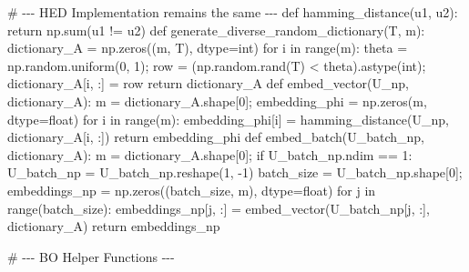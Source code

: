 \documentclass[
  letterpaper,
  DIV=11,
  numbers=noendperiod]{scrartcl}
\newenvironment{Shaded}{\begin{snugshade}}{\end{snugshade}}
\newcommand{\BuiltInTok}[1]{\textcolor[rgb]{0.00,0.23,0.31}{#1}}
\newcommand{\CommentTok}[1]{\textcolor[rgb]{0.37,0.37,0.37}{#1}}
\newcommand{\ControlFlowTok}[1]{\textcolor[rgb]{0.00,0.23,0.31}{#1}}
\newcommand{\DecValTok}[1]{\textcolor[rgb]{0.68,0.00,0.00}{#1}}
\newcommand{\KeywordTok}[1]{\textcolor[rgb]{0.00,0.23,0.31}{#1}}
\newcommand{\NormalTok}[1]{\textcolor[rgb]{0.00,0.23,0.31}{#1}}
\newcommand{\OperatorTok}[1]{\textcolor[rgb]{0.37,0.37,0.37}{#1}}
\begin{document}
\begin{Shaded}
\begin{Highlighting}[]
\CommentTok{\# {-}{-}{-} HED Implementation remains the same {-}{-}{-}}
\KeywordTok{def}\NormalTok{ hamming\_distance(u1, u2): }\ControlFlowTok{return}\NormalTok{ np.}\BuiltInTok{sum}\NormalTok{(u1 }\OperatorTok{!=}\NormalTok{ u2)}
\KeywordTok{def}\NormalTok{ generate\_diverse\_random\_dictionary(T, m):}
\NormalTok{    dictionary\_A }\OperatorTok{=}\NormalTok{ np.zeros((m, T), dtype}\OperatorTok{=}\BuiltInTok{int}\NormalTok{)}
    \ControlFlowTok{for}\NormalTok{ i }\KeywordTok{in} \BuiltInTok{range}\NormalTok{(m): theta }\OperatorTok{=}\NormalTok{ np.random.uniform(}\DecValTok{0}\NormalTok{, }\DecValTok{1}\NormalTok{)}\OperatorTok{;}\NormalTok{ row }\OperatorTok{=}\NormalTok{ (np.random.rand(T) }\OperatorTok{\textless{}}\NormalTok{ theta).astype(}\BuiltInTok{int}\NormalTok{)}\OperatorTok{;}\NormalTok{ dictionary\_A[i, :] }\OperatorTok{=}\NormalTok{ row}
    \ControlFlowTok{return}\NormalTok{ dictionary\_A}
\KeywordTok{def}\NormalTok{ embed\_vector(U\_np, dictionary\_A):}
\NormalTok{    m }\OperatorTok{=}\NormalTok{ dictionary\_A.shape[}\DecValTok{0}\NormalTok{]}\OperatorTok{;}\NormalTok{ embedding\_phi }\OperatorTok{=}\NormalTok{ np.zeros(m, dtype}\OperatorTok{=}\BuiltInTok{float}\NormalTok{)}
    \ControlFlowTok{for}\NormalTok{ i }\KeywordTok{in} \BuiltInTok{range}\NormalTok{(m): embedding\_phi[i] }\OperatorTok{=}\NormalTok{ hamming\_distance(U\_np, dictionary\_A[i, :])}
    \ControlFlowTok{return}\NormalTok{ embedding\_phi}
\KeywordTok{def}\NormalTok{ embed\_batch(U\_batch\_np, dictionary\_A):}
\NormalTok{    m }\OperatorTok{=}\NormalTok{ dictionary\_A.shape[}\DecValTok{0}\NormalTok{]}\OperatorTok{;}
    \ControlFlowTok{if}\NormalTok{ U\_batch\_np.ndim }\OperatorTok{==} \DecValTok{1}\NormalTok{: U\_batch\_np }\OperatorTok{=}\NormalTok{ U\_batch\_np.reshape(}\DecValTok{1}\NormalTok{, }\OperatorTok{{-}}\DecValTok{1}\NormalTok{)}
\NormalTok{    batch\_size }\OperatorTok{=}\NormalTok{ U\_batch\_np.shape[}\DecValTok{0}\NormalTok{]}\OperatorTok{;}\NormalTok{ embeddings\_np }\OperatorTok{=}\NormalTok{ np.zeros((batch\_size, m), dtype}\OperatorTok{=}\BuiltInTok{float}\NormalTok{)}
    \ControlFlowTok{for}\NormalTok{ j }\KeywordTok{in} \BuiltInTok{range}\NormalTok{(batch\_size): embeddings\_np[j, :] }\OperatorTok{=}\NormalTok{ embed\_vector(U\_batch\_np[j, :], dictionary\_A)}
    \ControlFlowTok{return}\NormalTok{ embeddings\_np}


\CommentTok{\# {-}{-}{-} BO Helper Functions {-}{-}{-}}


\end{Highlighting}
\end{Shaded}
\end{document}
